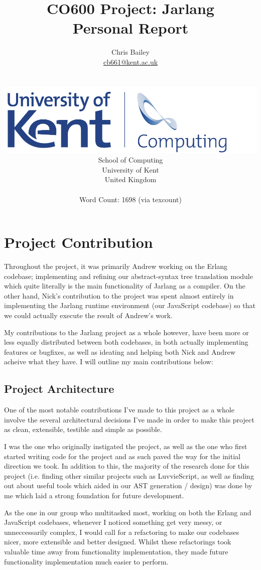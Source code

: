 \documentclass[twoside,12pt,titlepage,a4paper]{article}
\title{CO600 Project: Jarlang\\ Personal Report}
\author{
	\begin{tabular}{ c c c }
		Chris Bailey\\
		\url{cb661@kent.ac.uk}
	\end{tabular}\\
	\\ \vspace{10mm}
		\includegraphics[scale=0.6]{Kent_Comp_294_RGB} \\
		School of Computing \\
		University of Kent \\
		United Kingdom \\ \vspace{10mm} \\ Word Count: 1698 (via texcount)}
\begin{document}
\maketitle
\restoregeometry              %

\section{Project Contribution}
\label{Project Contribution}
	Throughout the project, it was primarily Andrew working on the Erlang codebase; implementing and refining
	our abstract-syntax tree translation module which quite literally is the main functionality of Jarlang as a compiler. On
	the other hand, Nick's contribution to the project was spent almost entirely in implementing the Jarlang runtime environment 
	(our JavaScript codebase) so that we could actually execute the result of Andrew's work.

	My contributions to the Jarlang project as a whole however, have been more or less equally distributed between both codebases,
	in both actually implementing features or bugfixes, as well as ideating and helping both Nick and Andrew acheive what they have.
	I will outline my main contributions below:

	\subsection{Project Architecture}
		One of the most notable contributions I've made to this project as a whole involve the several architectural decisions
		I've made in order to make this project as clean, extensible, testible and simple as possible.

		I was the one who originally instigated the project, as well as the one who first started writing code for the project 
		and as such paved the way for the initial direction we took. In addition to this,
		the majority of the research done for this project (i.e. finding other similar projects such as LuvvieScript, as
		well as finding out about useful tools which aided in our AST generation / design) was done by me which laid a
		strong foundation for future development.

		As the one in our group who multitasked most, working on both the Erlang and JavaScript codebases, whenever I noticed
		something get very messy, or unneccessarily complex, I would call for a refactoring to make our codebases nicer,
		more extensible and better designed. Whilst these refactorings took valuable time away
		from functionality implementation, they made future functionality implementation much easier to perform. 
\end{document}
